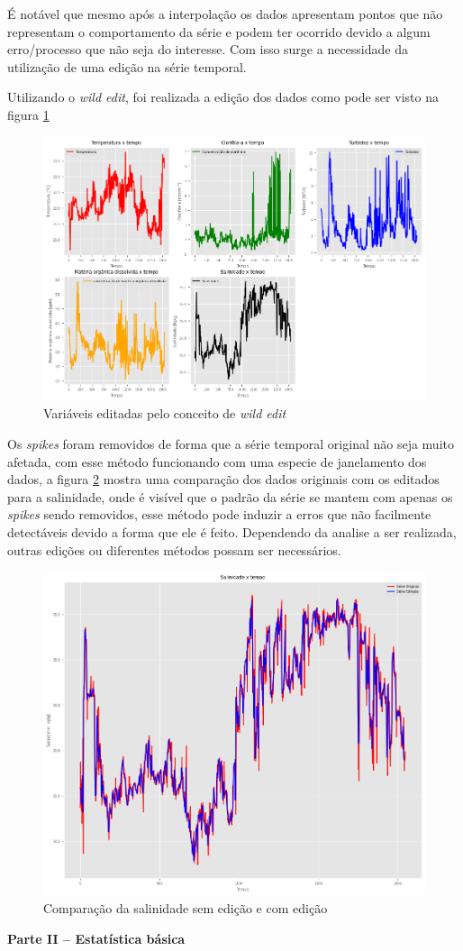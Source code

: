\documentclass[12pt,a4paper,portuguese]{article}
\begin{document}
	É notável que mesmo após a interpolação os dados apresentam pontos que não representam o comportamento da série e podem ter ocorrido devido a algum erro/processo que não seja do interesse. Com isso surge a necessidade da utilização de uma edição na série temporal.
	
	Utilizando o \textit{wild edit}, foi realizada a edição dos dados como pode ser visto na figura \ref{fig:lista1-2i}
\begin{figure}[H]
	\centering
	\includegraphics[width=1\linewidth]{lista1-2i}
	\caption{Variáveis editadas pelo conceito de \textit{wild edit}}
	\label{fig:lista1-2i}
\end{figure}
	
	Os \textit{spikes} foram removidos de forma que a série temporal original não seja muito afetada, com esse método funcionando com uma especie de janelamento dos dados, a figura \ref{fig:lista1-2} mostra uma comparação dos dados originais com os editados para a salinidade, onde é visível que o padrão da série se mantem com apenas os \textit{spikes} sendo removidos, esse método pode induzir a erros que não facilmente detectáveis devido a forma que ele é feito. Dependendo da analise a ser realizada, outras edições ou diferentes métodos possam ser necessários.

\begin{figure}[H]
	\centering
	\includegraphics[width=0.8\linewidth]{lista1-2}
	\caption{Comparação da salinidade sem edição e com edição}
	\label{fig:lista1-2}
\end{figure}
	\newpage
	\textbf{Parte II – Estatística básica}
	
\end{document}
